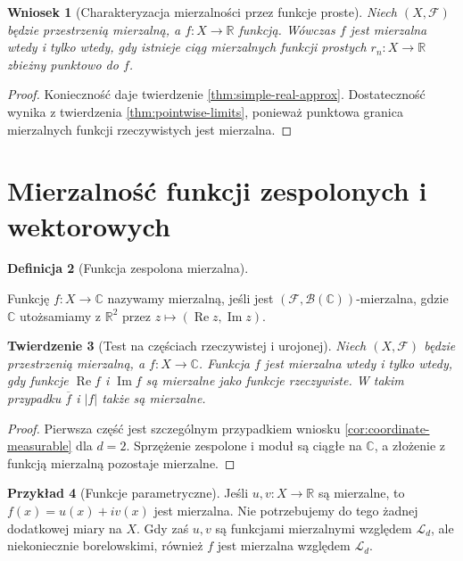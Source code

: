 \documentclass[11pt,a4paper,oneside]{book}
\numberwithin{equation}{chapter}
\theoremstyle{plain}
\newtheorem{twierdzenie}{Twierdzenie}[chapter]
\newtheorem{wniosek}[twierdzenie]{Wniosek}
\theoremstyle{definition}
\newtheorem{definicja}[twierdzenie]{Definicja}
\newtheorem{przyklad}[twierdzenie]{Przykład}
\theoremstyle{remark}
\begin{document}
\begin{wniosek}[Charakteryzacja mierzalności przez funkcje proste]
\label{cor:meas-simple-characterization}
Niech $(X,\mathcal F)$ będzie przestrzenią mierzalną,
a $f:X\to\mathbb R$ funkcją. Wówczas $f$ jest
mierzalna wtedy i tylko wtedy, gdy istnieje
ciąg mierzalnych funkcji prostych $r_n:X\to\mathbb R$
zbieżny punktowo do $f$.
\end{wniosek}
\begin{proof}
Konieczność daje twierdzenie \ref{thm:simple-real-approx}.
Dostateczność wynika z twierdzenia
\ref{thm:pointwise-limits}, ponieważ punktowa granica
mierzalnych funkcji rzeczywistych jest mierzalna.
\end{proof}

\section{Mierzalność funkcji zespolonych i wektorowych}

\begin{definicja}[Funkcja zespolona mierzalna]\label{idx:06:definicja:11}

Funkcję $f:X\to\mathbb C$ nazywamy mierzalną,
jeśli jest $(\mathcal F,\mathcal B(\mathbb C))$-mierzalna,
gdzie $\mathbb C$ utożsamiamy z $\mathbb R^2$
przez $z\mapsto(\operatorname{Re}z,\operatorname{Im}z)$.
\end{definicja}

\begin{twierdzenie}[Test na częściach rzeczywistej i urojonej]
\label{thm:complex-test}
Niech $(X,\mathcal F)$ będzie przestrzenią mierzalną,
a $f:X\to\mathbb C$. Funkcja $f$ jest mierzalna
wtedy i tylko wtedy, gdy funkcje
$\operatorname{Re}f$ i $\operatorname{Im}f$ są
mierzalne jako funkcje rzeczywiste. W takim przypadku
$\overline f$ i $|f|$ także są mierzalne.
\end{twierdzenie}
\begin{proof}
Pierwsza część jest szczególnym przypadkiem
wniosku \ref{cor:coordinate-measurable} dla $d=2$.
Sprzężenie zespolone i moduł są ciągłe na $\mathbb C$,
a złożenie z funkcją mierzalną pozostaje mierzalne.
\end{proof}

\begin{przyklad}[Funkcje parametryczne]
Jeśli $u,v:X\to\mathbb R$ są mierzalne, to
$f(x)=u(x)+iv(x)$ jest mierzalna.
Nie potrzebujemy do tego żadnej dodatkowej miary
na $X$. Gdy zaś $u,v$ są funkcjami mierzalnymi
względem $\mathcal L_d$, ale niekoniecznie
borelowskimi, również $f$ jest mierzalna względem
$\mathcal L_d$.
\end{przyklad}
\end{document}
